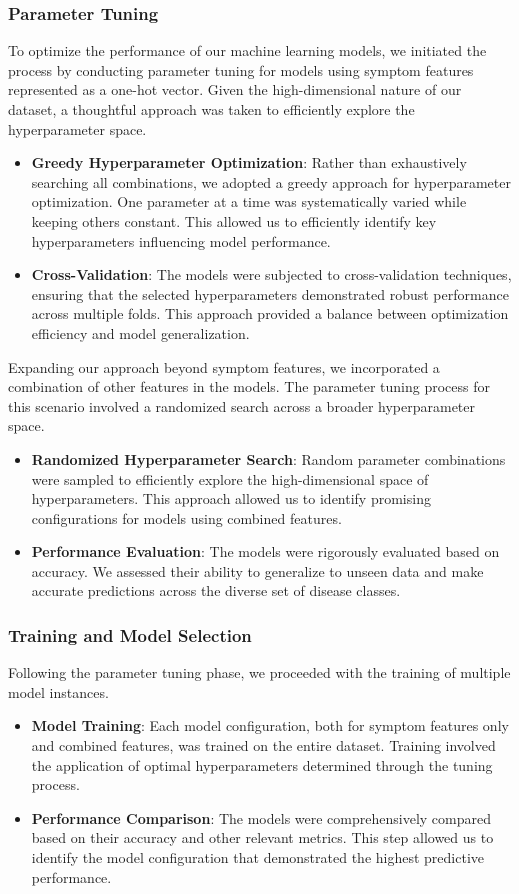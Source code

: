 \subsubsection{Parameter Tuning}
To optimize the performance of our machine learning models, we initiated the process by conducting parameter tuning for models using symptom features represented as a one-hot vector. Given the high-dimensional nature of our dataset, a thoughtful approach was taken to efficiently explore the hyperparameter space.
\begin{itemize}
    \item \textbf{Greedy Hyperparameter Optimization}: Rather than exhaustively searching all combinations, we adopted a greedy approach for hyperparameter optimization. One parameter at a time was systematically varied while keeping others constant. This allowed us to efficiently identify key hyperparameters influencing model performance.
    \item \textbf{Cross-Validation}: The models were subjected to cross-validation techniques, ensuring that the selected hyperparameters demonstrated robust performance across multiple folds. This approach provided a balance between optimization efficiency and model generalization.
\end{itemize}
Expanding our approach beyond symptom features, we incorporated a combination of other features in the models. The parameter tuning process for this scenario involved a randomized search across a broader hyperparameter space.
\begin{itemize}
    \item \textbf{Randomized Hyperparameter Search}: Random parameter combinations were sampled to efficiently explore the high-dimensional space of hyperparameters. This approach allowed us to identify promising configurations for models using combined features.
    \item \textbf{Performance Evaluation}: The models were rigorously evaluated based on accuracy. We assessed their ability to generalize to unseen data and make accurate predictions across the diverse set of disease classes.
\end{itemize}

\subsubsection{Training and Model Selection}
Following the parameter tuning phase, we proceeded with the training of multiple model instances.
\begin{itemize}
    \item \textbf{Model Training}: Each model configuration, both for symptom features only and combined features, was trained on the entire dataset. Training involved the application of optimal hyperparameters determined through the tuning process.
    \item \textbf{Performance Comparison}: The models were comprehensively compared based on their accuracy and other relevant metrics. This step allowed us to identify the model configuration that demonstrated the highest predictive performance.
\end{itemize}
